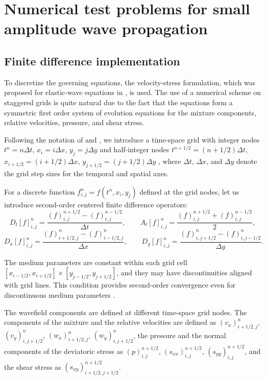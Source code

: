 \documentclass[3p,times,table]{article}
\begin{document}
\section{Numerical test problems for small amplitude wave 
propagation}\label{sec.numerics}

\subsection{Finite difference implementation}
To discretize the governing equations, the velocity-stress formulation, which was
proposed for elastic-wave equations in  \cite{Levander1988,Virieux1986}, is used. 
The use of a numerical scheme on staggered grids is quite natural due to 
the fact that the equations form a symmetric first order system of evolution 
equations for the  mixture components, relative velocities, pressure, and 
shear stress.

Following the notation of \cite{Virieux1986} and \cite{Graves1996}, we 
introduce a time-space grid with integer nodes $t^{n}=n\Delta t$, 
$x_{i}=i\Delta 
x$, $y_{j}=j\Delta y$  and half-integer nodes $t^{n+1/2}=(n+1/2)\Delta t$, 
$x_{i+1/2}=(i+1/2)\Delta x$, $y_{j+1/2}=(j+1/2)\Delta y$ , where  $\Delta t$, 
$\Delta x$, and $\Delta y$ denote the grid step sizes for the temporal and spatial 
axes.

 For a discrete function $f_{i,j}^{n}=f(t^{n},x_{i},y_{j})$ defined at the grid 
 nodes, let us introduce second-order  centered finite difference 
 operators:
\begin{equation}
    D_t[f]_{i, j}^{n} = \frac{(f)_{i, j}^{n+1/2} - (f)_{i, j}^{n-1/2}}{\Delta t}, \qquad A_t[f]_{i, j}^{n} = \frac{(f)_{i, j}^{n+1/2} + (f)_{i ,j}^{n-1/2}}{2},
    \label{Dt}
\end{equation}
\begin{equation}
    D_x[f]_{i, j}^n = \frac{(f)_{i+1/2, j}^{n} - (f)_{i-1/2, j}^{n}}{\Delta x}, \qquad D_y[f]_{i, j}^n = \frac{(f)_{i, j+1/2}^{n} - (f)_{i, j-1/2}^{n}}{\Delta y}.
    \label{Dx}
\end{equation}

The medium parameters are constant within each grid cell 
$[x_{i-1/2}, x_{i+1/2}] \times[ y_{j-1/2}, y_{j+1/2}]$, and they may have 
discontinuities aligned with grid lines. This condition provides  
second-order convergence even for discontinuous medium parameters 
\cite{Moszo2002}.

The wavefield components are defined at different time-space grid nodes. The 
components of the mixture and the relative velocities are defined as $(v_x)_{i+1/2, 
j}^{n}$, $(v_y)_{i, j+1/2}^{n}$, $(w_x)_{i+1/2, j}^{n}$, $(w_y)_{i, 
j+1/2}^{n}$, the pressure and the normal components of the deviatoric stress as 
$(p)_{i,j}^{n+1/2}$,  $(s_{xx})_{i,j}^{n+1/2}$, $(s_{yy})_{i,j}^{n+1/2}$, and 
the shear stress as $(s_{xy})_{i+1/2, j+1/2}^{n+1/2}$.
\end{document}
